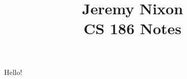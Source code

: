 \documentclass[11pt]{article}
\author{}
\begin{document}
\title{Jeremy Nixon \\CS 186 Notes}
\maketitle

Hello!
\end{document}
